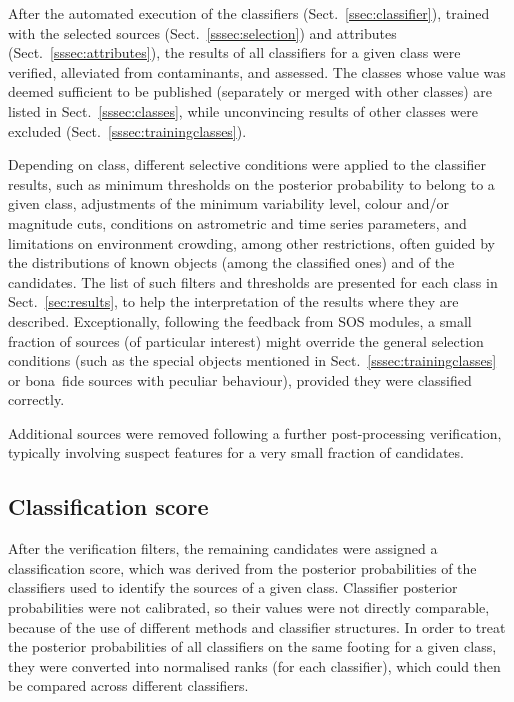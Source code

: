 \documentclass[longauth]{aa}
\begin{document}
After the automated execution of the classifiers (Sect.~\ref{ssec:classifier}), trained with the selected sources (Sect.~\ref{sssec:selection}) and attributes (Sect.~\ref{sssec:attributes}), the results of all classifiers for a given class were verified, alleviated from contaminants, and assessed. The classes whose value was deemed sufficient to be published (separately or merged with other classes) are listed in Sect.~\ref{sssec:classes}, while unconvincing results of other classes were excluded (Sect.~\ref{sssec:trainingclasses}).

Depending on class, different selective conditions were applied to the classifier results, such as minimum thresholds on the posterior probability to belong to a given class, adjustments of the minimum variability level, colour and/or magnitude cuts, conditions on astrometric and time series parameters, and limitations on environment crowding, among other restrictions, often guided by the distributions of known objects (among the classified ones) and of the candidates. The list of such filters and thresholds are presented for each class in Sect.~\ref{sec:results}, to help the interpretation of the results where they are described.  Exceptionally, following the feedback from SOS modules, a small fraction of sources (of particular interest) might override the general selection conditions (such as the special objects mentioned in Sect.~\ref{sssec:trainingclasses} or bona~fide sources with peculiar behaviour), provided they were classified correctly. 

Additional sources were removed following a further post-processing verification, typically involving suspect features for a very small fraction of candidates. 


\subsection{Classification score\label{ssec:class_score}}

After the verification filters, the remaining candidates were assigned a classification score, which was derived from the posterior probabilities of the classifiers used to identify the sources of a given class. 
Classifier posterior probabilities were not calibrated, so their values were not directly comparable, because of the use of different methods and classifier structures. 
In order to treat the posterior probabilities of all classifiers on the same footing for a given class, they were converted into normalised ranks (for each classifier), which could then be compared across different classifiers.
\end{document}
